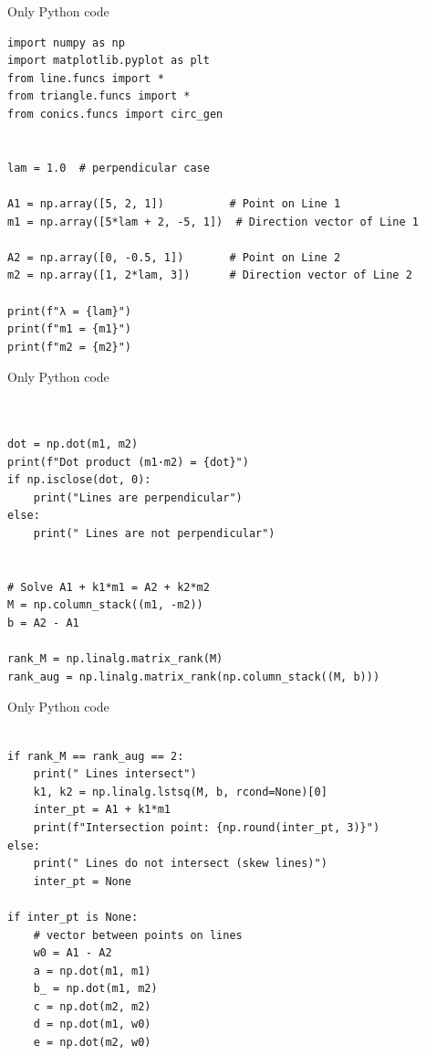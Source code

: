 \documentclass{beamer}
\begin{document}
  \begin{frame}[fragile]{Only Python code}
\begin{lstlisting}
import numpy as np
import matplotlib.pyplot as plt
from line.funcs import *
from triangle.funcs import *
from conics.funcs import circ_gen


lam = 1.0  # perpendicular case

A1 = np.array([5, 2, 1])          # Point on Line 1
m1 = np.array([5*lam + 2, -5, 1])  # Direction vector of Line 1

A2 = np.array([0, -0.5, 1])       # Point on Line 2
m2 = np.array([1, 2*lam, 3])      # Direction vector of Line 2

print(f"λ = {lam}")
print(f"m1 = {m1}")
print(f"m2 = {m2}")

 \end{lstlisting}
\end{frame}
  \begin{frame}[fragile]{Only Python code}
\begin{lstlisting}


dot = np.dot(m1, m2)
print(f"Dot product (m1·m2) = {dot}")
if np.isclose(dot, 0):
    print("Lines are perpendicular")
else:
    print(" Lines are not perpendicular")


# Solve A1 + k1*m1 = A2 + k2*m2
M = np.column_stack((m1, -m2))
b = A2 - A1

rank_M = np.linalg.matrix_rank(M)
rank_aug = np.linalg.matrix_rank(np.column_stack((M, b)))

 \end{lstlisting}
\end{frame}
  \begin{frame}[fragile]{Only Python code}
\begin{lstlisting}

if rank_M == rank_aug == 2:
    print(" Lines intersect")
    k1, k2 = np.linalg.lstsq(M, b, rcond=None)[0]
    inter_pt = A1 + k1*m1
    print(f"Intersection point: {np.round(inter_pt, 3)}")
else:
    print(" Lines do not intersect (skew lines)")
    inter_pt = None

if inter_pt is None:
    # vector between points on lines
    w0 = A1 - A2
    a = np.dot(m1, m1)
    b_ = np.dot(m1, m2)
    c = np.dot(m2, m2)
    d = np.dot(m1, w0)
    e = np.dot(m2, w0)
  
 \end{lstlisting}
\end{frame}
\end{document}
